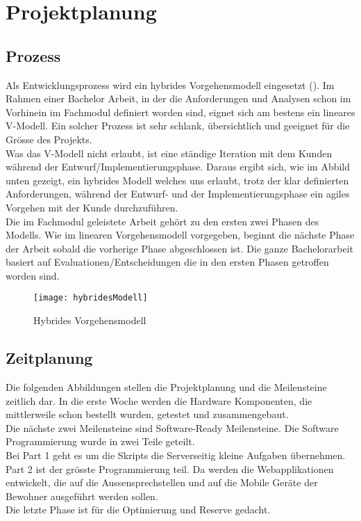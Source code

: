 \section{Projektplanung}
\label{sec:chapterexample}

\subsection{Prozess}
\label{sec:chapterexample}

Als Entwicklungsprozess wird ein hybrides Vorgehensmodell eingesetzt (). Im Rahmen einer Bachelor Arbeit, in der die Anforderungen und Analysen schon im Vorhinein im Fachmodul definiert worden sind, eignet sich am bestens ein lineares V-Modell. Ein solcher Prozess ist sehr schlank, übersichtlich und geeignet für die Grösse des Projekts.
\\
Was das V-Modell nicht erlaubt, ist eine ständige Iteration mit dem Kunden während der Entwurf/Implementierungsphase. Daraus ergibt sich, wie im Abbild unten gezeigt, ein hybrides Modell welches uns erlaubt, trotz der klar definierten Anforderungen, während der Entwurf- und der Implementierungsphase ein agiles Vorgehen mit der Kunde durchzuführen.
\\
Die im Fachmodul geleistete Arbeit gehört zu den ersten zwei Phasen des Modells. Wie im linearen Vorgehensmodell vorgegeben, beginnt die nächste Phase der Arbeit sobald die vorherige Phase abgeschlossen ist. Die ganze Bachelorarbeit basiert auf Evaluationen/Entscheidungen die in den ersten Phasen getroffen worden sind.  

\begin{figure}[htb!]
	\begin{center}
		\texttt{[image: hybridesModell]}
		\caption[Hybrides Vorgehensmodell]{Hybrides Vorgehensmodell}
		\label{fig:hybridesModell}
	\end{center}
\end{figure}


\subsection{Zeitplanung}
\label{sec:chapterexample}

Die folgenden Abbildungen stellen die Projektplanung und die Meilensteine zeitlich dar. In die erste Woche werden die Hardware Komponenten, die mittlerweile schon bestellt wurden, getestet und zusammengebaut.
\\
Die nächste zwei Meilensteine sind Software-Ready Meilensteine. Die Software Programmierung wurde in zwei Teile geteilt.
\\ 
Bei Part 1 geht es um die Skripts die Serverseitig kleine Aufgaben übernehmen. Part 2 ist der grösste Programmierung teil. Da werden die Webapplikationen entwickelt, die auf die Aussensprechstellen und auf die Mobile Geräte der Bewohner ausgeführt werden sollen.
\\
Die letzte Phase ist für die Optimierung und Reserve gedacht.

